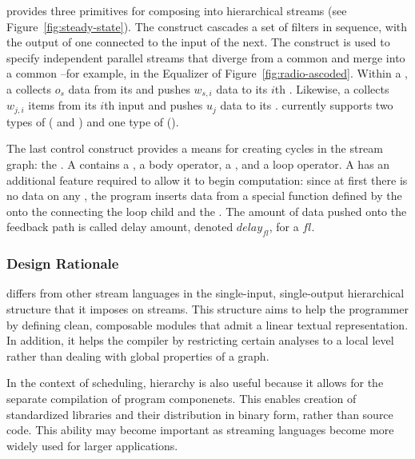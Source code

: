 
{\StreamIt} provides three primitives for composing {\filters} into
hierarchical streams (see Figure~\ref{fig:steady-state}).  The
{\pipeline} construct cascades a set of filters in sequence, with the
output of one connected to the input of the next.  The {\splitjoin}
construct is used to specify independent parallel streams that diverge
from a common {\splitter} and merge into a common {\joiner}--for
example, in the Equalizer of Figure~\ref{fig:radio-ascoded}.  Within a
{\splitjoin}, a {\splitter} collects $o_s$ data from its {\Input}
{\Channel} and pushes $w_{s,i}$ data to its $i$th {\Output}
{\Channel}.  Likewise, a {\joiner} collects $w_{j,i}$ items from its
$i$th input {\Input}{\Channel} and pushes $u_j$ data to its
{\Output}{\Channel}.  {\StreamIt} currently supports two types of
{\splitters} ({\duplicate} and {\roundrobin}) and one type of
{\joiner} (\roundrobin).

The last control construct provides a means for creating cycles in the
stream graph: the {\feedbackloop}. A {\feedbackloop} contains a
{\joiner}, a body operator, a {\splitter}, and a loop operator.  A
{\feedbackloop} has an additional feature required to allow it to
begin computation: since at first there is no data on any {\Channels},
the program inserts data from a special function defined by the
{\feedbackloop} onto the {\Channel} connecting the loop child and the
{\joiner}. The amount of data pushed onto the feedback path is called
delay amount, denoted $delay_{fl}$, for a {\feedbackloop} $fl$.

\subsubsection{Design Rationale}

{\StreamIt} differs from other stream languages in the single-input,
single-output hierarchical structure that it imposes on streams.  This
structure aims to help the programmer by defining clean, composable
modules that admit a linear textual representation.  In addition, it
helps the compiler by restricting certain analyses to a local level
rather than dealing with global properties of a graph.

In the context of scheduling, hierarchy is also useful because it
allows for the separate compilation of program componenets.  This
enables creation of standardized libraries and their distribution in
binary form, rather than source code.  This ability may become
important as streaming languages become more widely used for larger
applications.

